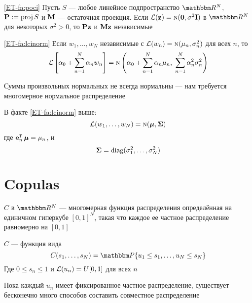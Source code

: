 \begin{frame}

    \vspace{2em}
    \Fact\eqref{ET-fa:poci}
    Пусть $S$ --- любое линейное подпространство $\RR^N$, $\mathbf P := \operatorname{proj} S$ и
    $\mathbf M$ --- остаточная проекция. Если $\mathcal L({\mathbf z}) = \textrm{\sc n}({\mathbf 0},
    \sigma^2 \mathbf I)$ в $\RR^N$ для некоторых $\sigma^2 > 0$, то $\mathbf P {\mathbf z}$ и
    $\mathbf M {\mathbf z}$ независимые
    
    \vspace{1em}
    \Fact\eqref{ET-fa:lcinorm}
        Если $w_1, \ldots, w_N$ независимые с $\mathcal L(w_n) = \textrm{\sc n}(\mu_n,
        \sigma_n^2)$ для всех $n$, то
        \begin{equation*}
            \mathcal L \left[ \alpha_0 + \sum_{n=1}^N \alpha_n w_n \right]
            = \textrm{\sc n} \left( 
                \alpha_0 + \sum_{n=1}^N \alpha_n \mu_n,\;
                \sum_{n=1}^N \alpha_n^2 \sigma_n^2
                \right)
        \end{equation*}
\end{frame}

\begin{frame}

    \vspace{1em}
    Суммы произвольных нормальных не всегда нормальны --- нам требуется 
    многомерное нормальное распределение
    
    \vspace{1em}
    В факте \eqref{ET-fa:lcinorm} выше:
    $$\mathcal L(w_1, \ldots, w_N) = \textrm{\sc n}({\boldsymbol \mu},
    {\boldsymbol \Sigma})$$ 
    где $\bolde_n^\T \, \boldmu = \mu_n$, и
    $${\boldsymbol \Sigma} =
    \operatorname{diag}(\sigma_1^2, \ldots, \sigma_N^2)$$
 
    
\end{frame}

\section{Copulas}

\begin{frame}

    \vspace{2em}
     $C$ в $\RR^N$ --- многомерная функция распределения определённая на
    единичном гиперкубе $[0, 1]^N$, такая что
    каждое ее частное распределение равномерно на $[0, 1]$
    
    $C$ --- функция вида
    \begin{equation}
        \label{eq:icif}
        C(s_1, \ldots, s_N) = \PP \{u_1 \leq s_1, \ldots, u_N \leq s_N\}
    \end{equation}
    Где $0 \leq s_n \leq 1$ и $\mathcal L(u_n) = U[0, 1]$ для всех $n$
    
    \vspace{1em}
    Пока каждый $u_n$ имеет фиксированное частное распределение, существует 
    бесконечно много способов составить совместное распределение
        
\end{frame}

